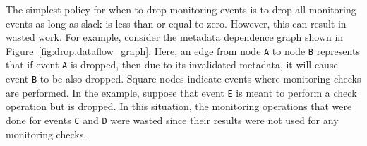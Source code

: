 The simplest policy for when to drop monitoring events is to drop all monitoring events as
long as slack is less than or equal to zero.  However, this can result in
wasted work. For example, consider the metadata dependence graph shown in
Figure~\ref{fig:drop.dataflow_graph}. Here, an edge from node {\tt A} to node
{\tt B} represents that if event {\tt A} is dropped, then due to its
invalidated metadata, it will cause event {\tt B} to be also dropped. Square
nodes indicate events where monitoring checks are performed. In the
example, suppose that event {\tt E} is meant to perform a check operation but is dropped.
In this situation, the
monitoring operations that were done for events {\tt C} and {\tt D} were wasted
since their results were not used for any monitoring checks.

\begin{figure}
  \begin{center}
\end{center}
\end{figure}
